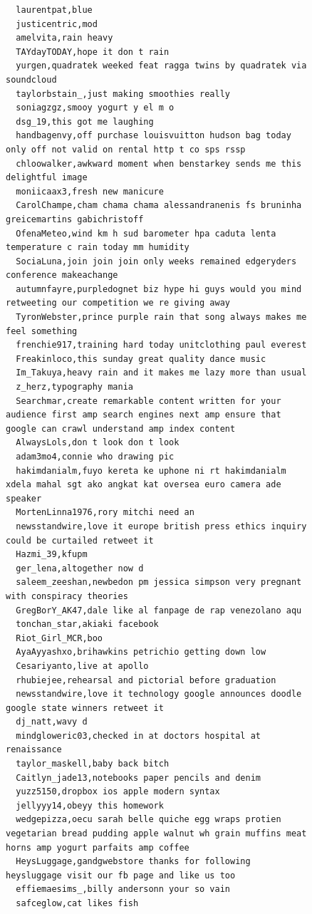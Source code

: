 \begin{figure}[htpb]
\begin{verbatim}
  laurentpat,blue
  justicentric,mod
  amelvita,rain heavy
  TAYdayTODAY,hope it don t rain
  yurgen,quadratek weeked feat ragga twins by quadratek via soundcloud
  taylorbstain_,just making smoothies really
  soniagzgz,smooy yogurt y el m o
  dsg_19,this got me laughing
  handbagenvy,off purchase louisvuitton hudson bag today only off not valid on rental http t co sps rssp
  chloowalker,awkward moment when benstarkey sends me this delightful image
  moniicaax3,fresh new manicure
  CarolChampe,cham chama chama alessandranenis fs bruninha greicemartins gabichristoff
  OfenaMeteo,wind km h sud barometer hpa caduta lenta temperature c rain today mm humidity
  SociaLuna,join join join only weeks remained edgeryders conference makeachange
  autumnfayre,purpledognet biz hype hi guys would you mind retweeting our competition we re giving away
  TyronWebster,prince purple rain that song always makes me feel something
  frenchie917,training hard today unitclothing paul everest
  Freakinloco,this sunday great quality dance music
  Im_Takuya,heavy rain and it makes me lazy more than usual
  z_herz,typography mania
  Searchmar,create remarkable content written for your audience first amp search engines next amp ensure that google can crawl understand amp index content
  AlwaysLols,don t look don t look
  adam3mo4,connie who drawing pic
  hakimdanialm,fuyo kereta ke uphone ni rt hakimdanialm xdela mahal sgt ako angkat kat oversea euro camera ade speaker
  MortenLinna1976,rory mitchi need an
  newsstandwire,love it europe british press ethics inquiry could be curtailed retweet it
  Hazmi_39,kfupm
  ger_lena,altogether now d
  saleem_zeeshan,newbedon pm jessica simpson very pregnant with conspiracy theories
  GregBorY_AK47,dale like al fanpage de rap venezolano aqu
  tonchan_star,akiaki facebook
  Riot_Girl_MCR,boo
  AyaAyyashxo,brihawkins petrichio getting down low
  Cesariyanto,live at apollo
  rhubiejee,rehearsal and pictorial before graduation
  newsstandwire,love it technology google announces doodle google state winners retweet it
  dj_natt,wavy d
  mindgloweric03,checked in at doctors hospital at renaissance
  taylor_maskell,baby back bitch
  Caitlyn_jade13,notebooks paper pencils and denim
  yuzz5150,dropbox ios apple modern syntax
  jellyyy14,obeyy this homework
  wedgepizza,oecu sarah belle quiche egg wraps protien vegetarian bread pudding apple walnut wh grain muffins meat horns amp yogurt parfaits amp coffee
  HeysLuggage,gandgwebstore thanks for following heysluggage visit our fb page and like us too
  effiemaesims_,billy andersonn your so vain
  safceglow,cat likes fish

\end{verbatim}
\end{figure}
